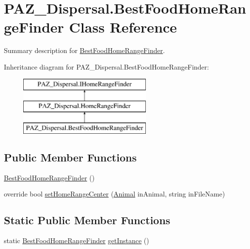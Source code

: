 \hypertarget{class_p_a_z___dispersal_1_1_best_food_home_range_finder}{\section{P\-A\-Z\-\_\-\-Dispersal.\-Best\-Food\-Home\-Range\-Finder Class Reference}
\label{class_p_a_z___dispersal_1_1_best_food_home_range_finder}
}


Summary description for \hyperlink{class_p_a_z___dispersal_1_1_best_food_home_range_finder}{Best\-Food\-Home\-Range\-Finder}.  


Inheritance diagram for P\-A\-Z\-\_\-\-Dispersal.\-Best\-Food\-Home\-Range\-Finder\-:\begin{figure}[H]
\begin{center}
\leavevmode
\includegraphics[height=3.000000cm]{class_p_a_z___dispersal_1_1_best_food_home_range_finder}
\end{center}
\end{figure}
\subsection*{Public Member Functions}
\begin{DoxyCompactItemize}
\item 
\hyperlink{class_p_a_z___dispersal_1_1_best_food_home_range_finder_a080881051d0f9a321399931a6e5c44d0}{Best\-Food\-Home\-Range\-Finder} ()
\item 
override bool \hyperlink{class_p_a_z___dispersal_1_1_best_food_home_range_finder_a3172a84ca1e8c4b973cdf650aaeb4390}{set\-Home\-Range\-Center} (\hyperlink{class_p_a_z___dispersal_1_1_animal}{Animal} in\-Animal, string in\-File\-Name)
\end{DoxyCompactItemize}
\subsection*{Static Public Member Functions}
\begin{DoxyCompactItemize}
\item 
static \hyperlink{class_p_a_z___dispersal_1_1_best_food_home_range_finder}{Best\-Food\-Home\-Range\-Finder} \hyperlink{class_p_a_z___dispersal_1_1_best_food_home_range_finder_a08859e2e918b85ed981a740931e2fb1a}{get\-Instance} ()
\end{DoxyCompactItemize}
